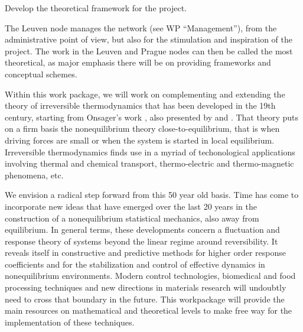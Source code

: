 \begin{workpackage}[id=WPcore,wphases=0-48,
  short=Gen. Theory, %
  title=General Theory, %
  lead=KUL,
  KULRM=36,UNIPDRM=6]

\newrefsection

\begin{wpobjectives}
\begin{compactitem}
\item Develop the theoretical framework for the project.
\end{compactitem}
\end{wpobjectives}

\begin{wpdescription}

The Leuven node manages the network (see WP ``Management''), from the administrative point
of view, but also for the stimulation and inspiration of the project. The work in the Leuven
and Prague nodes can then be called the most theoretical, as major emphasis there will be on
providing frameworks and conceptual schemes.

Within this work package, we will work on complementing and extending the theory of
irreversible thermodynamics that has been developed in the 19th century, starting from
Onsager's work \cite{onsager1,onsager2}, also presented by \cite{degrootmazur} and \cite{kubo}.
%
That theory puts on a firm basis the nonequilibrium theory close-to-equilibrium, that is
when driving forces are small or when the system is started in local equilibrium.
%
Irreversible thermodynamics finds use in a myriad of techonological applications involving
thermal and chemical transport, thermo-electric and thermo-magnetic phenomena, etc.

We envision a radical step forward from this 50 year old basis. Time has come to incorporate
new ideas that have emerged over the last 20 years in the construction of a nonequilibrium
statistical mechanics, also away from equilibrium.
%
In general terms, these developments concern a fluctuation and response theory of systems
beyond the linear regime around reversibility. It reveals itself in constructive and
predictive methods for higher order response coefficients and for the stabilization and
control of effective dynamics in nonequilibrium environments.
%
Modern control technologies, biomedical and food processing techniques and new directions in
materials research will undoubtly need to cross that boundary in the future. This
workpackage will provide the main resources on mathematical and theoretical levels to make
free way for the implementation of these techniques.


\end{wpdescription}
\end{workpackage}
